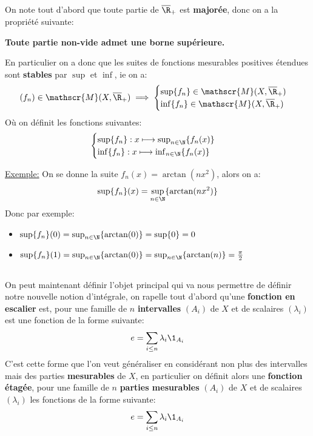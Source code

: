 \subsection*{}
On note tout d'abord que toute partie de \(\overline{\R}_+\) est \textbf{majorée}, donc on a la propriété suivante:
\begin{center}
   \textbf{Toute partie non-vide admet une borne supérieure.}
\end{center}
En particulier on a donc que les suites de fonctions mesurables positives étendues sont \textbf{stables} par \(\sup\) et \(\inf\), ie on a:
\[
   (f_n) \in \mathscr{M}(X, \overline{\R}_+) \implies \begin{cases}\textstyle{\sup}\{f_n\} \in \mathscr{M}(X, \overline{\R}_+) \\ \textstyle{\inf}\{f_n\} \in \mathscr{M}(X, \overline{\R}_+)\end{cases} 
\]
Où on définit les fonctions suivantes:
\[
   \begin{cases}
      \sup\{f_n\}: x \longmapsto \sup_{n \in \N}\{f_n(x)\}\\
      \inf\{f_n\}: x \longmapsto \inf_{n \in \N}\{f_n(x)\}     
   \end{cases}
\]
\pagebreak

\uline{Exemple:} On se donne la suite \(f_n(x) = \arctan(nx^2)\), alors on a:
\[
   \sup\{f_n\}(x) = \sup_{n \in \N}\{\arctan(nx^2)\}
\]
Donc par exemple:
\begin{itemize}
   \item \(\sup\{f_n\}(0) = \sup_{n \in \N}\{\arctan(0)\} = \sup\{0\} = 0\)
   \item \(\sup\{f_n\}(1) = \sup_{n \in \N}\{\arctan(0)\} = \sup_{n \in \N}\{\arctan(n)\} = \frac{\pi}{2}\)
\end{itemize}
\subsection*{}
On peut maintenant définir l'objet principal qui va nous permettre de définir notre nouvelle notion d'intégrale, on rapelle tout d'abord qu'une \textbf{fonction en escalier} est, pour une famille de \(n\) \textbf{intervalles} \((A_i)\) de \(X\) et de scalaires \((\lambda_i)\) est une fonction de la forme suivante:
\[
   e = \sum_{i \leq n} \lambda_i\1_{A_i}
\]
C'est cette forme que l'on veut généraliser en considérant non plus des intervalles mais des parties \textbf{mesurables} de \(X\), en particulier on définit alors une \textbf{fonction étagée}, pour une famille de \(n\) \textbf{parties mesurables} \((A_i)\) de \(X\) et de scalaires \((\lambda_i)\) les fonctions de la forme suivante:
\[
   e = \sum_{i \leq n} \lambda_i\1_{A_i}
\]
